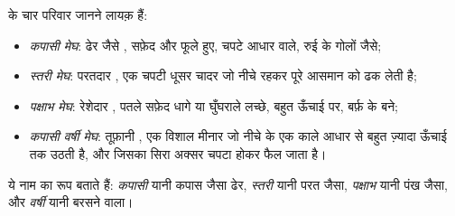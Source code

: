 \begin{definition}[बादलों के परिवार]\label{def:g4:clouds-rain-snow:cloud-families}
 के चार परिवार जानने लायक़ हैं:
\begin{itemize}
  \item \emph{कपासी मेघ}: ढेर जैसे , सफ़ेद और फूले
        हुए, चपटे आधार वाले, रुई के गोलों जैसे;
  \item \emph{स्तरी मेघ}: परतदार , एक चपटी धूसर चादर
        जो नीचे रहकर पूरे आसमान को ढक लेती है;
  \item \emph{पक्षाभ मेघ}: रेशेदार , पतले सफ़ेद धागे
        या घुँघराले लच्छे, बहुत ऊँचाई पर, बर्फ़ के बने;
  \item \emph{कपासी वर्षी मेघ}: तूफ़ानी , एक
        विशाल मीनार जो नीचे के एक काले आधार से बहुत ज़्यादा ऊँचाई तक उठती है,
        और जिसका सिरा अक्सर चपटा होकर फैल जाता है।
\end{itemize}
\end{definition}

ये नाम  का रूप बताते हैं: \emph{कपासी} यानी कपास जैसा ढेर, \emph{स्तरी}
यानी परत जैसा, \emph{पक्षाभ} यानी पंख जैसा, और \emph{वर्षी} यानी बरसने वाला।


